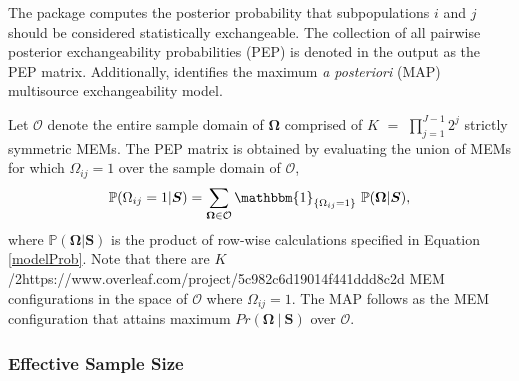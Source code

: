 The  package computes the posterior probability that subpopulations $i$ and $j$ should be considered statistically exchangeable. The collection of all pairwise posterior exchangeability probabilities (PEP) is denoted in the output as the PEP matrix. Additionally,  identifies the maximum {\em a posteriori} (MAP) multisource exchangeability model.

Let $\mathcal{O}$ denote the entire sample domain of $\bm{\Omega}$ comprised of $K$ $=$ $\prod_{j=1}^{J-1} 2^j$ strictly symmetric MEMs. The PEP matrix is obtained by evaluating the union of MEMs for which $\Omega_{ij} = 1$ over the sample domain of $\mathcal{O}$,
\begin{equation*}
\mathbb{P}(\Omega_{ij} = 1 | {\bm S} ) = \sum_{\bm{\Omega} \in \mathcal{O}} \mathbbm{1}_{\{\Omega_{ij} = 1\}} \ \mathbb{P}(\bm{\Omega} | {\bm S}),
\end{equation*}
where $\mathbb{P}(\bm{\Omega} | {\bm S})$ is the product of row-wise calculations specified in Equation \ref{modelProb}. Note that there are $K$/2https://www.overleaf.com/project/5c982c6d19014f441ddd8c2d MEM configurations in the space of $\mathcal{O}$ where $\Omega_{ij}=1$. The MAP follows as the MEM configuration that attains maximum $Pr(\bm{\Omega}\:|\: \bm{S})$ over $\mathcal{O}.$


\subsubsection{Effective Sample Size}

